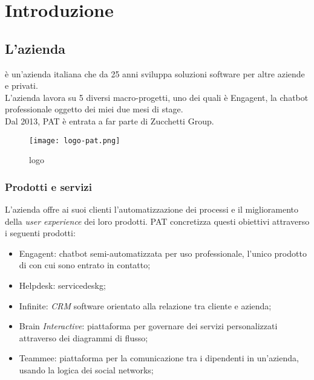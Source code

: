 
\chapter{Introduzione}
\label{cap:introduzione}
\section{L'azienda}

\company{} è un'azienda italiana che da 25 anni sviluppa soluzioni software per altre aziende e privati.\\
L'azienda lavora su 5 diversi macro-progetti, uno dei quali è Engagent, la chatbot professionale oggetto dei miei due mesi di stage.\\
Dal 2013, PAT è entrata a far parte di Zucchetti Group.
\begin{figure}[H]
    \centering
    \texttt{[image: logo-pat.png]} 
    \caption{logo \company{}}
    \label{logo:pat}
\end{figure}

\subsection{Prodotti e servizi}
L'azienda offre ai suoi clienti l'automatizzazione dei processi e il miglioramento della \textit{user experience} dei loro prodotti.
PAT concretizza questi obiettivi attraverso i seguenti prodotti:
\begin{itemize}
    \item Engagent: chatbot semi-automatizzata per uso professionale, l'unico prodotto di \company{} con cui sono entrato in contatto; 
    \item Helpdesk: \gls{servicedeskg}\glsfirstoccur;
    \item Infinite: \textit{CRM} software orientato alla relazione tra cliente e azienda;
    \item Brain \textit{Interactive}: piattaforma per governare dei servizi personalizzati attraverso dei diagrammi di flusso; 
    \item Teammee: piattaforma per la comunicazione tra i dipendenti in un'azienda, usando la logica dei social networks;
\end{itemize}

